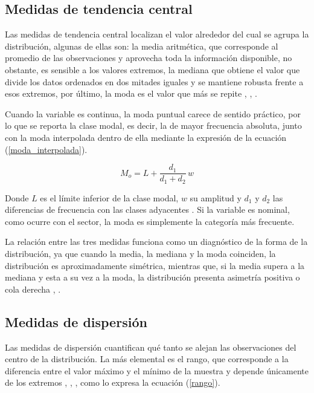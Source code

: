     \subsection{Medidas de tendencia central}
        Las medidas de tendencia central localizan el valor alrededor del cual se agrupa
        la distribución, algunas de ellas son: la media aritmética, que corresponde al
        promedio de las observaciones y aprovecha toda la información disponible, no
        obstante, es sensible a los valores extremos, la mediana que obtiene el valor
        que divide los datos ordenados en dos mitades iguales y se mantiene robusta
        frente a esos extremos, por último, la moda es el valor que más se repite
        \cite{triola2018estadistica}, \cite{walpole2012probabilidad},
        \cite{castro2026visualizacion}.

        \vspace{10pt}

        Cuando la variable es continua, la moda puntual carece de sentido práctico, por
        lo que se reporta la clase modal, es decir, la de mayor frecuencia absoluta,
        junto con la moda interpolada dentro de ella mediante la expresión de la
        ecuación (\ref{moda_interpolada}).

        \begin{equation}
            M_{o} = L + \frac{d_{1}}{d_{1} + d_{2}} \, w
            \label{moda_interpolada}
        \end{equation}

        Donde $L$ es el límite inferior de la clase modal, $w$ su amplitud y $d_{1}$ y
        $d_{2}$ las diferencias de frecuencia con las clases adyacentes
        \cite{walpole2012probabilidad}. Si la variable es nominal, como ocurre con el
        sector, la moda es simplemente la categoría más frecuente.

        \vspace{10pt}

        La relación entre las tres medidas funciona como un diagnóstico de la forma de
        la distribución, ya que cuando la media, la mediana y la moda coinciden, la
        distribución es aproximadamente simétrica, mientras que, si la media supera a la
        mediana y esta a su vez a la moda, la distribución presenta asimetría positiva o
        cola derecha \cite{triola2018estadistica}, \cite{castro2026visualizacion}.

    \subsection{Medidas de dispersión}
        Las medidas de dispersión cuantifican qué tanto se alejan las observaciones del
        centro de la distribución. La más elemental es el rango, que corresponde a la
        diferencia entre el valor máximo y el mínimo de la muestra y depende únicamente
        de los extremos \cite{triola2018estadistica}, \cite{walpole2012probabilidad},
        \cite{castro2026visualizacion}, como lo expresa la ecuación (\ref{rango}).

